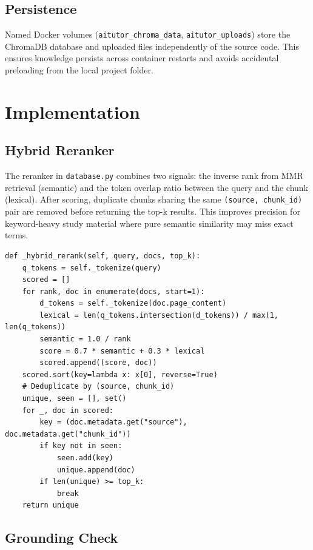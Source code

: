 \documentclass[12pt,a4paper]{article}
\begin{document}
\subsection{Persistence}

Named Docker volumes (\texttt{aitutor\_chroma\_data}, \texttt{aitutor\_uploads}) store
the ChromaDB database and uploaded files independently of the source code. This ensures
knowledge persists across container restarts and avoids accidental preloading from
the local project folder.

\section{Implementation}

\subsection{Hybrid Reranker}

The reranker in \texttt{database.py} combines two signals: the inverse rank from MMR
retrieval (semantic) and the token overlap ratio between the query and the chunk
(lexical). After scoring, duplicate chunks sharing the same \texttt{(source, chunk\_id)}
pair are removed before returning the top-k results. This improves precision for
keyword-heavy study material where pure semantic similarity may miss exact terms.

\begin{lstlisting}[caption={Hybrid reranking score in database.py}]
def _hybrid_rerank(self, query, docs, top_k):
    q_tokens = self._tokenize(query)
    scored = []
    for rank, doc in enumerate(docs, start=1):
        d_tokens = self._tokenize(doc.page_content)
        lexical = len(q_tokens.intersection(d_tokens)) / max(1, len(q_tokens))
        semantic = 1.0 / rank
        score = 0.7 * semantic + 0.3 * lexical
        scored.append((score, doc))
    scored.sort(key=lambda x: x[0], reverse=True)
    # Deduplicate by (source, chunk_id)
    unique, seen = [], set()
    for _, doc in scored:
        key = (doc.metadata.get("source"), doc.metadata.get("chunk_id"))
        if key not in seen:
            seen.add(key)
            unique.append(doc)
        if len(unique) >= top_k:
            break
    return unique
\end{lstlisting}

\subsection{Grounding Check}
\end{document}
